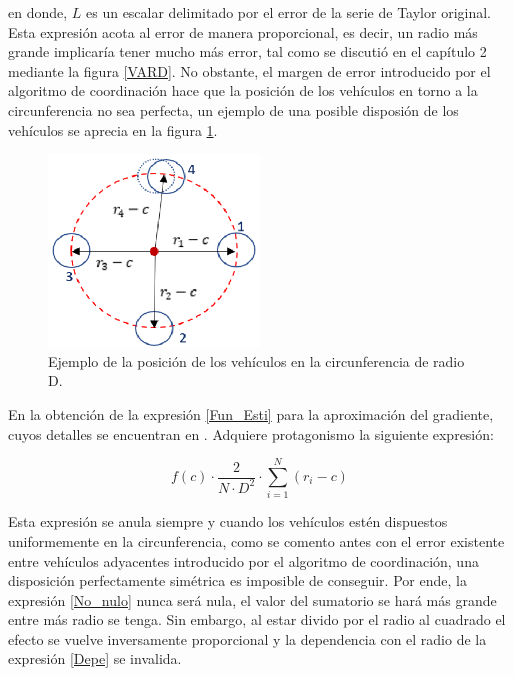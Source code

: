 en donde, $L$ es un escalar delimitado por el error de la serie de Taylor original. Esta expresión acota al error de manera proporcional, es decir, un radio más grande implicaría tener mucho más error, tal como se discutió en el capítulo 2 mediante la figura \ref{VARD}. No obstante, el margen de error introducido por el algoritmo de coordinación hace que la posición de los vehículos en torno a la circunferencia no sea perfecta, un ejemplo de una posible disposión de los vehículos se aprecia en la figura \ref{Grafo_Nuevo}.

\begin{figure}[H]
\centering
\includegraphics[width=0.50\textwidth]{figures/New_Grafo.eps}
\caption{Ejemplo de la posición de los vehículos en la circunferencia de radio D.} \label{Grafo_Nuevo}
\end{figure}

En la obtención de la expresión \ref{Fun_Esti} para la aproximación del gradiente, cuyos detalles se encuentran en \cite{Estimacion_Gradiente}. Adquiere protagonismo la siguiente expresión:

\begin{equation} \label{No_nulo} 
	f\left(c\right)\cdot\frac{2}{N\cdot{D}^2}\cdot\sum_{i=1}^{N}\left(r_{i}-c\right)
\end{equation}

Esta expresión se anula siempre y cuando los vehículos estén dispuestos uniformemente en la circunferencia, como se comento antes con el error existente entre vehículos adyacentes introducido por el algoritmo de coordinación, una disposición perfectamente simétrica es imposible de conseguir. Por ende, la expresión \ref{No_nulo} nunca será nula, el valor del sumatorio se hará más grande entre más radio se tenga. Sin embargo, al estar divido por el radio al cuadrado el efecto se vuelve inversamente proporcional y la dependencia con el radio de la expresión \ref{Depe} se invalida.

